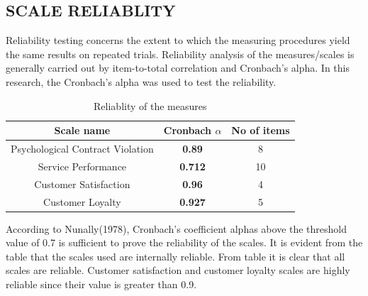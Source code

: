 \documentclass[a4paper, 12pt]{extarticle}
\begin{document}
{\subsection{SCALE RELIABLITY}
Reliability testing concerns the extent to which the measuring procedures yield the same results on repeated trials. Reliability analysis of the measures/scales is generally carried out by item-to-total correlation and Cronbach's alpha. In this research, the Cronbach's  alpha was used to test the reliability.
\begin{table}[H]
\centering
\begin{tabular}{|c|c|c|}
\hline
\textbf{Scale name} & \textbf{Cronbach $\alpha$} & \textbf{No of items}\\
\hline
Psychological Contract Violation & \textbf{0.89} & 8\\
\hline
Service Performance & \textbf{0.712} & 10\\
\hline
Customer Satisfaction & \textbf{0.96} & 4\\
\hline
Customer Loyalty & \textbf{0.927} & 5 \\
\hline
\end{tabular}
\caption{Reliablity of the measures}
\end{table}

\par According to Nunally(1978), Cronbach's coefficient alphas above the threshold value of 0.7 is sufficient to prove the reliability of the scales. It is evident from the table that the scales used are internally reliable. From table it is clear that all scales are reliable. Customer satisfaction and customer loyalty scales are highly reliable since their value is greater than 0.9.

}
\end{document}
